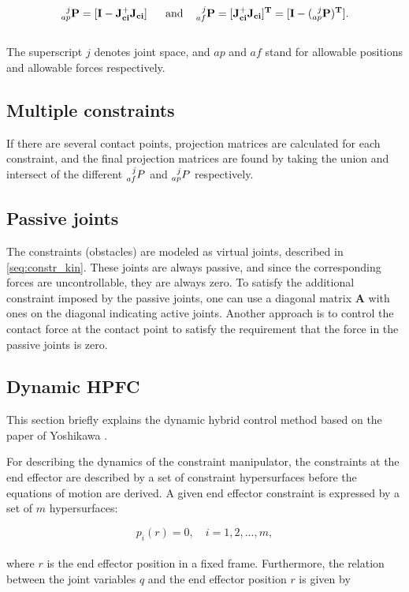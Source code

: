 \begin{equation}\label{eq:proj_mtrices}
    \mathbf{
    \prescript{j}{ap}{P} = [I - J_{ci}^+ J_{ci}] \ \ \quad \textrm{and} \quad
    \prescript{j}{af}{P} = [J_{ci}^+ J_{ci}]^T = [I - (\prescript{j}{ap}{P})^T]
    }.
\end{equation}
\\
The superscript $j$ denotes joint space, and $ap$ and $af$ stand for allowable positions and allowable forces respectively.

\subsection{Multiple constraints}

If there are several contact points, projection matrices are calculated for each constraint, and the final projection matrices are found by taking the union and intersect of the different $\prescript{j}{af}{P}$ and $\prescript{j}{ap}{P}$ respectively.

\subsection{Passive joints}
The constraints (obstacles) are modeled as virtual joints, described in \ref{seq:constr_kin}. These joints are always passive, and since the corresponding forces are uncontrollable, they are always zero. To satisfy the additional constraint imposed by the passive joints, one can use a diagonal matrix $\mathbf{A}$ with ones on the diagonal indicating active joints. Another approach is to control the contact force at the contact point to satisfy the requirement that the force in the passive joints is zero.

\subsection{Dynamic HPFC}\label{subseq:dynhpfc}

This section briefly explains the dynamic hybrid control method based on the paper of Yoshikawa \cite{yoshikawa1987dynamic}. 

For describing the dynamics of the constraint manipulator, the constraints at the end effector are described by a set of constraint hypersurfaces before the equations of motion are derived. A given end effector constraint is expressed by a set of $m$ hypersurfaces:

\begin{equation}\label{eq:dynhpfc0}
    p_i(r) = 0, \quad i = 1, 2, ..., m,
\end{equation}
\\
where $r$ is the end effector position in a fixed frame. Furthermore, the relation between the joint variables $q$ and the end effector position $r$ is given by

